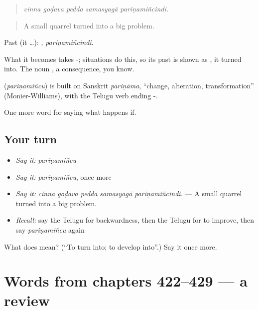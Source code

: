 \begin{quote}
\emph{cinna goḍava pedda samasyagā pariṇamiñcindi.}
\end{quote}

\begin{quote}
A small quarrel turned into a big problem.
\end{quote}

Past (it …): , \emph{pariṇamiñcindi}.

What it becomes takes -; situations do this, so its past is shown as , it turned into. The noun , a consequence, you know.

\begin{cousinweb}
\textbf{} (\emph{pariṇamiñcu}) is built on Sanskrit \emph{pariṇāma}, \textquotedblleft{}change, alteration, transformation\textquotedblright{} (Monier-Williams), with the Telugu verb ending -.
\end{cousinweb}

\begin{grammarlens}[title={What you've built}]
One more word for saying what happens if.
\end{grammarlens}

\subsection*{Your turn}
\begin{itemize}
\raggedright
  \item \emph{Say it:} \emph{pariṇamiñcu}
  \item \emph{Say it:} \emph{pariṇamiñcu}, once more
  \item \emph{Say it:} \emph{cinna goḍava pedda samasyagā pariṇamiñcindi.} — A small quarrel turned into a big problem.
  \item \emph{Recall:} say the Telugu for backwardness, then the Telugu for to improve, then say \emph{pariṇamiñcu} again
\end{itemize}

\begin{tcolorbox}[breakable,colback=teal!4,colframe=teal!35!black,title={Before you move on}]
What does  mean? (\textquotedblleft{}To turn into; to develop into\textquotedblright{}.) Say it once more.
\end{tcolorbox}
\section[(dialogue)]{Words from chapters 422–429 — a review}


